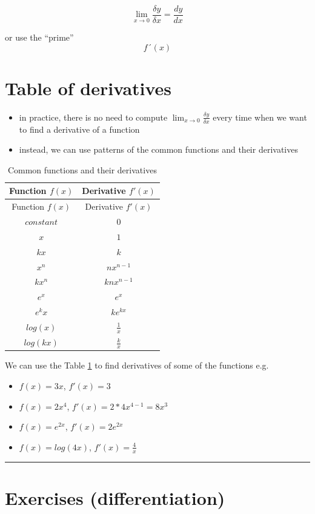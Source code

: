 \documentclass[
]{book}
\providecommand{\tightlist}{%
  \setlength{\itemsep}{0pt}\setlength{\parskip}{0pt}}
\theoremstyle{definition}
\theoremstyle{definition}
\theoremstyle{definition}
\theoremstyle{remark}
\begin{document}
\[\lim_{x\to0}\frac{\delta y}{\delta x}= \frac{dy}{dx}\]

or use the ``prime'' \[f´(x)\]

\hypertarget{table-of-derivatives}{%
\section{Table of derivatives}\label{table-of-derivatives}}

\begin{itemize}
\tightlist
\item
  in practice, there is no need to compute \(\lim_{x\to0}\frac{\delta y}{\delta x}\) every time when we want to find a derivative of a function
\item
  instead, we can use patterns of the common functions and their derivatives
\end{itemize}

\begin{longtable}[]{@{}cc@{}}
\caption{\label{tab:diff-table} Common functions and their derivatives}\tabularnewline
\toprule
Function \(f(x)\) & Derivative \(f'(x)\)\tabularnewline
\midrule
\endfirsthead
\toprule
Function \(f(x)\) & Derivative \(f'(x)\)\tabularnewline
\midrule
\endhead
\(constant\) & \(0\)\tabularnewline
\(x\) & \(1\)\tabularnewline
\(kx\) & \(k\)\tabularnewline
\(x^n\) & \(nx^{n-1}\)\tabularnewline
\(kx^n\) & \(knx^{n-1}\)\tabularnewline
\(e^x\) & \(e^x\)\tabularnewline
\(e^kx\) & \(ke^{kx}\)\tabularnewline
\(log(x)\) & \(\frac{1}{x}\)\tabularnewline
\(log(kx)\) & \(\frac{k}{x}\)\tabularnewline
\bottomrule
\end{longtable}

We can use the Table \ref{tab:diff-table} to find derivatives of some of the functions e.g.

\begin{itemize}
\tightlist
\item
  \(f(x) = 3x\), \(f'(x) = 3\)
\item
  \(f(x) = 2x^4\), \(f'(x) = 2*4x^{4-1} = 8x^3\)
\item
  \(f(x) = e^{2x}\), \(f'(x) = 2e^{2x}\)
\item
  \(f(x) = log(4x)\), \(f'(x) = \frac{4}{x}\)
\end{itemize}

\begin{center}\rule{0.5\linewidth}{0.5pt}\end{center}

\hypertarget{exercises-differentiation}{%
\section{Exercises (differentiation)}\label{exercises-differentiation}}
\end{document}
